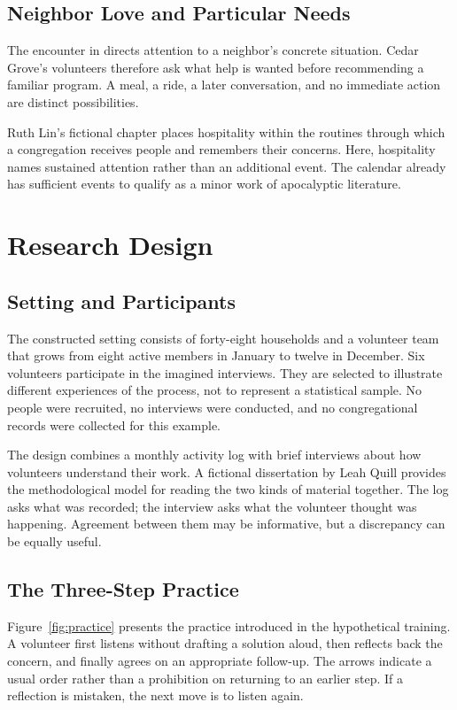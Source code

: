 \documentclass[font=termes]{mbts}
\begin{document}
\subsection{Neighbor Love and Particular Needs}
The encounter in  directs attention to a neighbor's
concrete situation. Cedar Grove's volunteers therefore ask what help is wanted
before recommending a familiar program. A meal, a ride, a later conversation,
and no immediate action are distinct possibilities.

Ruth Lin's fictional chapter places hospitality within the routines through
which a congregation receives people and remembers their concerns.
\autocite[87--89]{lin-hospitality} Here, hospitality names sustained attention
rather than an additional event. The calendar already has sufficient events
to qualify as a minor work of apocalyptic literature.

\section{Research Design}
\subsection{Setting and Participants}
The constructed setting consists of forty-eight households and a volunteer
team that grows from eight active members in January to twelve in December.
Six volunteers participate in the imagined interviews. They are selected to
illustrate different experiences of the process, not to represent a statistical
sample. No people were recruited, no interviews were conducted, and no
congregational records were collected for this example.

The design combines a monthly activity log with brief interviews about how
volunteers understand their work. A fictional dissertation by Leah Quill
provides the methodological model for reading the two kinds of material
together.\autocite[54--58]{quill-thesis} The log asks what was recorded; the
interview asks what the volunteer thought was happening. Agreement between
them may be informative, but a discrepancy can be equally useful.

\subsection{The Three-Step Practice}
Figure~\ref{fig:practice} presents the practice introduced in the hypothetical
training. A volunteer first listens without drafting a solution aloud, then
reflects back the concern, and finally agrees on an appropriate follow-up.
The arrows indicate a usual order rather than a prohibition on returning to
an earlier step. If a reflection is mistaken, the next move is to listen again.
\end{document}
